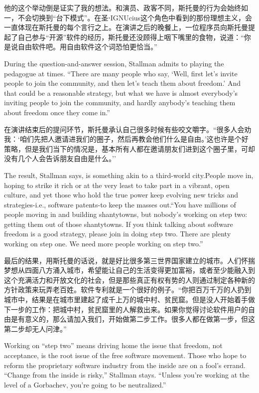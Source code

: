 \ifdefined\chs
他的这个举动倒是证实了我的想法。和演员、政客不同，斯托曼的行为会始终如一，不会切换到``台下模式''。在圣⋅IGNUcius这个角色中看到的那份理想主义，会一直体现在斯托曼的每个言行之上。在演讲之后的晚餐上，一位程序员向斯托曼提起了自己参与``开源''软件的经历，斯托曼还没顾得上咽下嘴里的食物，说道：``你是说自由软件吧。用自由软件这个词恐怕更恰当。''
\fi

\ifdefined\eng
During the question-and-answer session, Stallman admits to playing the pedagogue at times. ``There are many people who say, `Well, first let's invite people to join the community, and then let's teach them about freedom.' And that could be a reasonable strategy, but what we have is almost everybody's inviting people to join the community, and hardly anybody's teaching them about freedom once they come in.''
\fi

\ifdefined\chs
在演讲结束后的提问环节，斯托曼承认自己很多时候有些咬文嚼字。``很多人会劝我：`咱们先把人邀请进我们的圈子，然后再教会他们什么是自由。'这也许是个好策略，但是我们当下的情况是，基本所有人都在邀请朋友们进到这个圈子里，可却没有几个人会告诉朋友自由是什么。''
\fi

\ifdefined\eng
The result, Stallman says, is something akin to a third-world city.\ifdefined\vone People move in, hoping to strike it rich or at the very least to take part in a vibrant, open culture, and yet those who hold the true power keep evolving new tricks and strategies-i.e., software patents-to keep the masses out.\fi ``You have millions of people moving in and building shantytowns, but nobody's working on step two: getting them out of those shantytowns. If you think talking about software freedom is a good strategy, please join in doing step two. There are plenty working on step one. We need more people working on step two.''
\fi

\ifdefined\chs
最后的结果，用斯托曼的话说，就是好比很多第三世界国家建立的城市。\ifdefined\vone 人们怀揣梦想从四面八方涌入城市，希望能让自己的生活变得更加富裕，或者至少能融入到这个充满活力和开放文化的社会，但是那些真正有权有势的人则通过制定各种新的方针政策来玩弄老百姓。软件专利就是一个很好的例子。\fi ``你把百万千万的人扔到城市中，结果是在城市里建起了成千上万的城中村、贫民窟。但是没人开始着手做下一步的工作：把城中村，贫民窟里的人解救出来。如果你觉得讨论软件用户的自由是有意义的，那么请加入我们，开始做第二步工作。很多人都在做第一步，但这第二步却无人问津。''
\fi

\ifdefined\eng
Working on ``step two'' means driving home the issue that freedom, not acceptance, is the root issue of the free software movement. Those who hope to reform the proprietary software industry from the inside are on a fool's errand. ``Change from the inside is risky,'' Stallman stays. ``Unless you're working at the level of a Gorbachev, you're going to be neutralized.''
\fi

